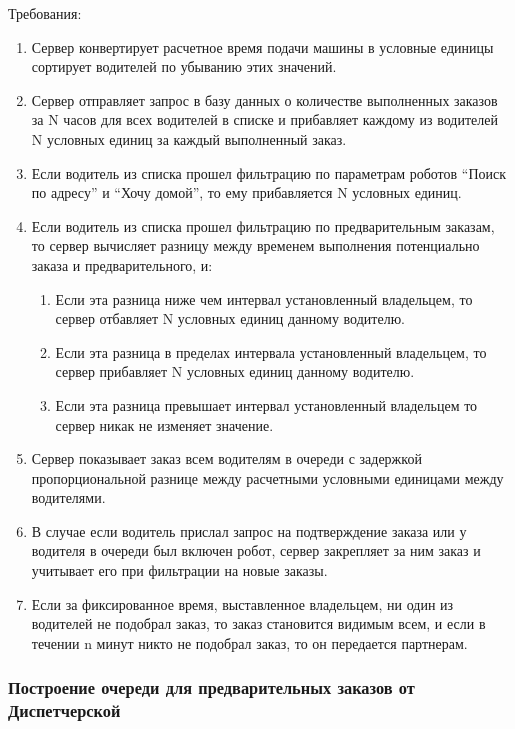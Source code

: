 			Требования:

			\begin{enumerate}
				\item{Сервер конвертирует расчетное время подачи машины в условные единицы сортирует водителей по убыванию этих значений.}

				\item{Сервер отправляет запрос в базу данных о количестве выполненных заказов за N часов для всех водителей в списке и прибавляет каждому из водителей N условных единиц  за каждый выполненный заказ.}

				\item{Если водитель из списка прошел фильтрацию по параметрам роботов “Поиск по адресу” и “Хочу домой”, то ему прибавляется N условных единиц.}

				\item{Если водитель из списка прошел фильтрацию по предварительным заказам, то сервер вычисляет разницу между временем выполнения потенциально заказа и предварительного, и: \begin{enumerate}[label*=\arabic*.] \item{Если эта разница ниже чем интервал установленный владельцем, то сервер отбавляет N условных единиц данному водителю.} \item{Если эта разница в пределах интервала установленный владельцем, то сервер прибавляет N условных единиц данному водителю.} \item{Если эта разница превышает интервал установленный владельцем то сервер никак не изменяет значение.} \end{enumerate}}

				\item{Сервер показывает заказ всем водителям в очереди с задержкой пропорциональной разнице между расчетными условными единицами между водителями.}

				\item{В случае если водитель прислал запрос на подтверждение заказа или у водителя в очереди был включен робот, сервер закрепляет за ним заказ и учитывает его при фильтрации на новые заказы.}

				\item{Если за фиксированное время, выставленное владельцем, ни один из водителей не подобрал заказ, то заказ становится видимым всем, и если в течении n минут никто не подобрал заказ, то он передается партнерам.}
			\end{enumerate}

		\subsubsection{Построение очереди для предварительных заказов от Диспетчерской}

